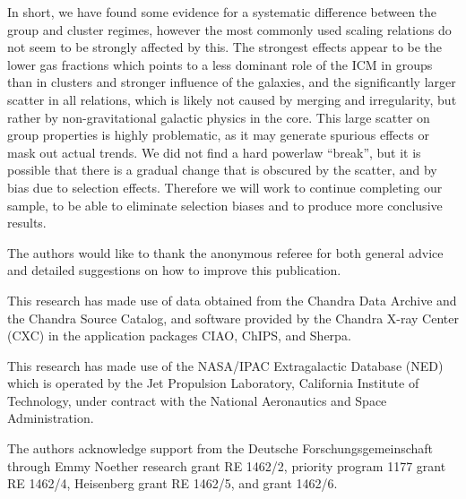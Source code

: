 \documentclass[structabstract]{aa}
\begin{document}
In short, we have found some evidence for a systematic difference
between the group and cluster regimes, however the most commonly used
scaling relations do not seem to be strongly affected by this. The
strongest effects appear to be the lower gas fractions which points to
a less dominant role of the ICM in groups than in clusters and
  stronger influence of the galaxies, and the significantly larger
scatter in all relations, which is likely not caused by merging and
irregularity, but rather by non-gravitational galactic physics
in the core. This large scatter on group properties is highly
problematic, as it may generate spurious effects or mask out actual
trends. We did not find a hard powerlaw ``break'', but it is
  possible that there is a gradual change that is obscured by the
  scatter, and by bias due to selection effects. Therefore we will
work to continue completing our sample, to be able to eliminate
selection biases and to produce more conclusive results.
%
%
%
%
\begin{acknowledgements}
The authors would like to thank the anonymous referee for both
  general advice and detailed suggestions on how to improve this publication.

This research has made use of data obtained from the Chandra Data Archive and
the Chandra Source Catalog, and software provided by the Chandra X-ray Center
(CXC) in the application packages CIAO, ChIPS, and Sherpa.

This research has made use of the NASA/IPAC Extragalactic Database
(NED) which is operated by the Jet Propulsion Laboratory, California
Institute of Technology, under contract with the National Aeronautics
and Space Administration.

The authors acknowledge support from the Deutsche Forschungsgemeinschaft 
through Emmy Noether research grant RE 1462/2, priority program 1177 grant 
RE 1462/4, Heisenberg grant RE 1462/5, and grant 1462/6.
\end{acknowledgements}

\nocite{Akritas-Bershady:96}
\nocite{Allen-Schmidt-Fabian:01}
\nocite{Anders-Grevesse:89}
\nocite{Baldi-Forman-Jones:09}
\nocite{Balogh-Mazzotta-Bower:10}
\nocite{Boehringer-Voges-Huchra:00}
\nocite{Boehringer-Schuecker-Guzzo:04}
\nocite{Boehringer-Pratt-Arnaud:10}
\nocite{Borgani-Murante-Springel:04}
\nocite{Cavaliere-Fusco-Femiano:76}
\end{document}
